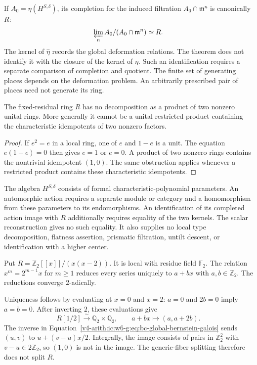 \begin{remark}
\label{v4-arith:ic:w10-e:global-relations}
If $A_0=\eta(H^{S,\delta})$, its completion for the induced filtration
$A_0\cap\mathfrak m^n$ is canonically $R$:
\[
 \varprojlim_n A_0/(A_0\cap\mathfrak m^n)\simeq R.
\]
The kernel of $\widehat\eta$ records the global deformation relations.
The theorem does not identify it with the closure of the kernel of
$\eta$. Such an identification requires a separate comparison of
completion and quotient. The finite set of generating places depends
on the deformation problem. An arbitrarily prescribed pair of places
need not generate its ring.
\end{remark}

\begin{proposition}
\label{v4-arith:ic:w10-e:local-product-obstruction}
The fixed-residual ring $R$ has no decomposition as a product of two
nonzero unital rings. More generally it cannot be a unital restricted
product containing the characteristic idempotents of two nonzero
factors.
\end{proposition}

\begin{proof}
If $e^2=e$ in a local ring, one of $e$ and $1-e$ is a unit.
The equation $e(1-e)=0$ then gives $e=1$ or $e=0$.
A product of two nonzero rings contains the nontrivial idempotent
$(1,0)$. The same obstruction applies whenever a restricted product
contains these characteristic idempotents.
\end{proof}

The algebra $H^{S,\delta}$ consists of formal characteristic-polynomial
parameters. An automorphic action requires a separate module or
category and a homomorphism from these parameters to its endomorphisms.
An identification of its completed action image with $R$ additionally
requires equality of the two kernels. The scalar reconstruction gives
no such equality. It also supplies no local type decomposition,
flatness assertion, prismatic filtration, untilt descent, or
identification with a higher center.


\begin{example}
\label{v4-arith:ic:w6-g:ex:generic-fibre-split}
Put $R=\mathbb Z_2[[x]]/(x(x-2))$.
It is local with residue field $\mathbb F_2$.
The relation $x^m=2^{m-1}x$ for $m\ge1$ reduces every series
uniquely to $a+bx$ with $a,b\in\mathbb Z_2$.
The reductions converge $2$-adically.

Uniqueness follows by evaluating at $x=0$ and $x=2$:
$a=0$ and $2b=0$ imply $a=b=0$.
After inverting $2$, these evaluations give
\begin{equation}
\label{v4-arith:ic:w6-g:eq:bc-global-bernstein-galois}
 R[1/2]\xrightarrow{\sim}\mathbb Q_2\times\mathbb Q_2,
 \qquad a+bx\longmapsto(a,a+2b).
\end{equation}
The inverse in Equation~\eqref{v4-arith:ic:w6-g:eq:bc-global-bernstein-galois}
sends $(u,v)$ to $u+(v-u)x/2$.
Integrally, the image consists of pairs in $\mathbb Z_2^2$ with
$v-u\in2\mathbb Z_2$, so $(1,0)$ is not in the image.
The generic-fiber splitting therefore does not split $R$.
\end{example}

